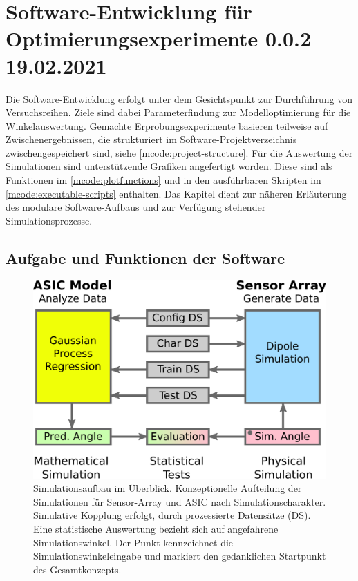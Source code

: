 %

\chapter{Software-Entwicklung für Optimierungsexperimente 0.0.2 19.02.2021}\label{ch:sw-entwicklung-f-opt-exp}


Die Software-Entwicklung erfolgt unter dem Gesichtspunkt zur Durchführung von Versuchsreihen. Ziele sind dabei Parameterfindung zur Modelloptimierung für die Winkelauswertung. Gemachte Erprobungsexperimente basieren teilweise auf Zwischenergebnissen, die strukturiert im Software-Projektverzeichnis zwischengespeichert sind, siehe \autoref{mcode:project-structure}.
Für die Auswertung der Simulationen sind unterstützende Grafiken angefertigt worden. Diese sind als Funktionen im \autoref{mcode:plotfunctions} und in den ausführbaren Skripten im \autoref{mcode:executable-scripts} enthalten. Das Kapitel dient zur näheren Erläuterung des modulare Software-Aufbaus und zur Verfügung stehender Simulationsprozesse.


\section{Aufgabe und Funktionen der Software}\label{sec:aufgabe-und-funktionen-sw}




\begin{figure}[htbp]
	\centering
	\includegraphics[width=0.7\linewidth]{chapters/images/3-SW-E-OExp/Software-Gesamtansicht}
	\caption[Simulationsaufbau im Überblick]{Simulationsaufbau im Überblick. Konzeptionelle Aufteilung der Simulationen für Sensor-Array und ASIC nach Simulationscharakter. Simulative Kopplung erfolgt, durch prozessierte Datensätze (DS). Eine statistische Auswertung bezieht sich auf angefahrene Simulationswinkel. Der Punkt kennzeichnet die Simulationswinkeleingabe und markiert den gedanklichen Startpunkt des Gesamtkonzepts.}
	\label{fig:software-gesamtansicht}
\end{figure}




